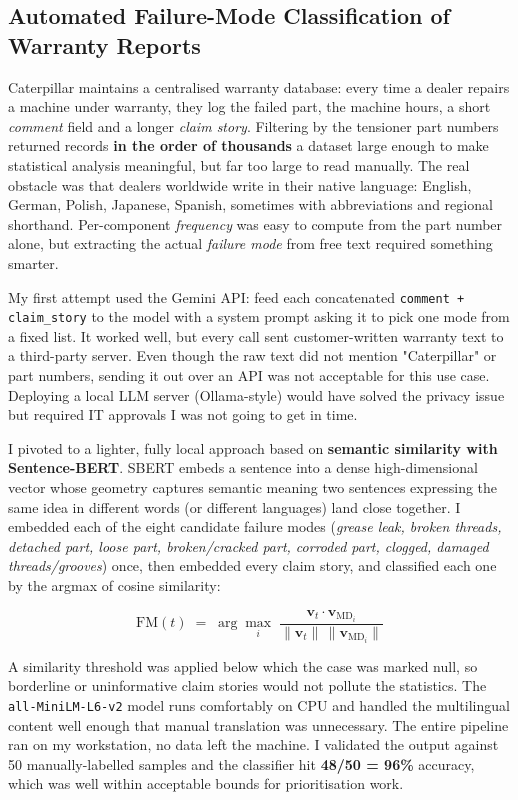 \documentclass[11pt,a4paper]{article}
\begin{document}
\subsection{Automated Failure-Mode Classification of Warranty Reports}

Caterpillar maintains a centralised warranty database: every time a dealer repairs a machine under warranty, they log the failed part, the machine hours, a short \textit{comment} field and a longer \textit{claim story}. Filtering by the tensioner part numbers returned records  \textbf{in the order of thousands}  a dataset large enough to make statistical analysis meaningful, but far too large to read manually. The real obstacle was that dealers worldwide write in their native language: English, German, Polish, Japanese, Spanish, sometimes with abbreviations and regional shorthand. Per-component \textit{frequency} was easy to compute from the part number alone, but extracting the actual \textit{failure mode} from free text required something smarter.

My first attempt used the Gemini API: feed each concatenated \texttt{comment + claim\_story} to the model with a system prompt asking it to pick one mode from a fixed list. It worked well, but every call sent customer-written warranty text to a third-party server. Even though the raw text did not mention "Caterpillar" or part numbers, sending it out over an API was not acceptable for this use case. Deploying a local LLM server (Ollama-style) would have solved the privacy issue but required IT approvals I was not going to get in time.

I pivoted to a lighter, fully local approach based on \textbf{semantic similarity with Sentence-BERT}. SBERT embeds a sentence into a dense high-dimensional vector whose geometry captures semantic meaning  two sentences expressing the same idea in different words (or different languages) land close together. I embedded each of the eight candidate failure modes (\textit{grease leak, broken threads, detached part, loose part, broken/cracked part, corroded part, clogged, damaged threads/grooves}) once, then embedded every claim story, and classified each one by the argmax of cosine similarity:

\[
\mathrm{FM}(t) \;=\; \arg\max_i \; \frac{\mathbf{v}_t \cdot \mathbf{v}_{\mathrm{MD}_i}}{\|\mathbf{v}_t\|\,\|\mathbf{v}_{\mathrm{MD}_i}\|}
\]

A similarity threshold was applied below which the case was marked null, so borderline or uninformative claim stories would not pollute the statistics. The \texttt{all-MiniLM-L6-v2} model runs comfortably on CPU and handled the multilingual content well enough that manual translation was unnecessary. The entire pipeline ran on my workstation, no data left the machine. I validated the output against 50 manually-labelled samples and the classifier hit \textbf{48/50 = 96\%} accuracy, which was well within acceptable bounds for prioritisation work.
\end{document}
